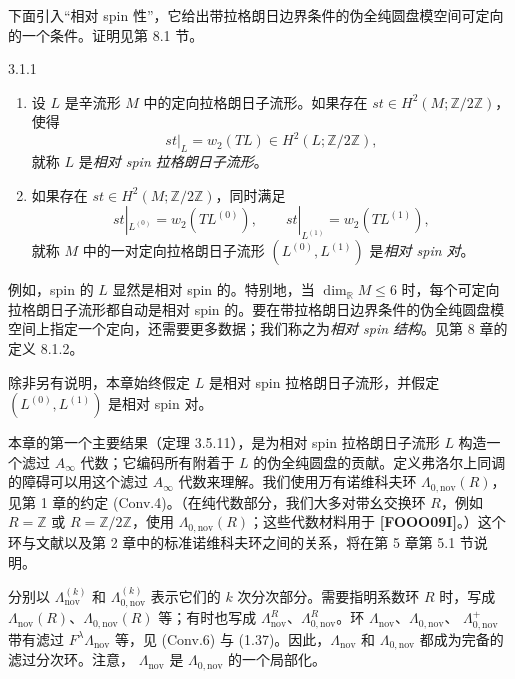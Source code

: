 下面引入“相对 spin 性”，它给出带拉格朗日边界条件的伪全纯圆盘模空间可定向的一个条件。证明见第 8.1 节。

\begin{definition}{3.1.1}\label{def:3-1-1}
\begin{enumerate}[label=\textup{(\arabic*)},leftmargin=2.8em]
  \item 设 $L$ 是辛流形 $M$ 中的定向拉格朗日子流形。如果存在
  $st\in H^2(M;\mathbb Z/2\mathbb Z)$，使得
  \[
    st|_L=w_2(TL)\in H^2(L;\mathbb Z/2\mathbb Z),
  \]
  就称 $L$ 是\emph{相对 spin 拉格朗日子流形}。

  \item 如果存在 $st\in H^2(M;\mathbb Z/2\mathbb Z)$，同时满足
  \[
    st|_{L^{(0)}}=w_2(TL^{(0)}),
    \qquad
    st|_{L^{(1)}}=w_2(TL^{(1)}),
  \]
  就称 $M$ 中的一对定向拉格朗日子流形
  $(L^{(0)},L^{(1)})$ 是\emph{相对 spin 对}。
\end{enumerate}
\end{definition}

例如，spin 的 $L$ 显然是相对 spin 的。特别地，当
$\dim_{\mathbb R}M\leq6$ 时，每个可定向拉格朗日子流形都自动是相对 spin 的。要在带拉格朗日边界条件的伪全纯圆盘模空间上指定一个定向，还需要更多数据；我们称之为\emph{相对 spin 结构}。见第 8 章的定义 8.1.2。

除非另有说明，本章始终假定 $L$ 是相对 spin 拉格朗日子流形，并假定
$(L^{(0)},L^{(1)})$ 是相对 spin 对。

本章的第一个主要结果（定理 3.5.11），是为相对 spin 拉格朗日子流形 $L$ 构造一个滤过 $A_\infty$ 代数；它编码所有附着于 $L$ 的伪全纯圆盘的贡献。定义弗洛尔上同调的障碍可以用这个滤过 $A_\infty$ 代数来理解。我们使用万有诺维科夫环
$\Lambda_{0,\mathrm{nov}}(R)$，见第 1 章的约定 (Conv.4)。（在纯代数部分，我们大多对带幺交换环 $R$，例如 $R=\mathbb Z$ 或
$R=\mathbb Z/2\mathbb Z$，使用 $\Lambda_{0,\mathrm{nov}}(R)$；这些代数材料用于 \textbf{[FOOO09I]}。）这个环与文献以及第 2 章中的标准诺维科夫环之间的关系，将在第 5 章第 5.1 节说明。

分别以 $\Lambda_{\mathrm{nov}}^{(k)}$ 和
$\Lambda_{0,\mathrm{nov}}^{(k)}$ 表示它们的 $k$ 次分次部分。需要指明系数环 $R$ 时，写成
$\Lambda_{\mathrm{nov}}(R)$、$\Lambda_{0,\mathrm{nov}}(R)$ 等；有时也写成
$\Lambda_{\mathrm{nov}}^R$、$\Lambda_{0,\mathrm{nov}}^R$。环
$\Lambda_{\mathrm{nov}}$、$\Lambda_{0,\mathrm{nov}}$、
$\Lambda_{0,\mathrm{nov}}^+$ 带有滤过 $F^\lambda\Lambda_{\mathrm{nov}}$ 等，见 (Conv.6) 与 (1.37)。因此，$\Lambda_{\mathrm{nov}}$ 和
$\Lambda_{0,\mathrm{nov}}$ 都成为完备的滤过分次环。注意，
$\Lambda_{\mathrm{nov}}$ 是 $\Lambda_{0,\mathrm{nov}}$ 的一个局部化。

